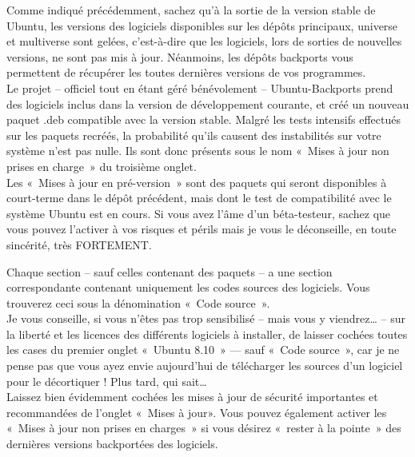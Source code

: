 {\begin{itemize}
\end{itemize}
Comme indiqué précédemment, sachez qu'à la sortie de la version stable de Ubuntu, les versions des logiciels disponibles sur les dépôts principaux, universe et multiverse sont gelées, c'est-à-dire que les logiciels, lors de sorties de nouvelles versions, ne sont pas mis à jour. Néanmoins, les dépôts backports vous permettent de récupérer les toutes dernières versions de vos programmes.\\
Le projet -- officiel tout en étant géré bénévolement -- Ubuntu-Backports prend des logiciels inclus dans la version de développement courante, et créé un nouveau paquet .deb compatible avec la version stable. Malgré les tests intensifs effectués sur les paquets recréés, la probabilité qu'ils causent des instabilités sur votre système n'est pas nulle. Ils sont donc présents sous le nom «~Mises à jour non prises en charge~» du troisième onglet.\\
Les «~Mises à jour en pré-version~» sont des paquets qui seront disponibles à court-terme dans le dépôt précédent, mais dont le test de compatibilité avec le système Ubuntu est en cours. Si vous avez l'âme d'un béta-testeur, sachez que vous pouvez l'activer à vos risques et périls mais je vous le déconseille, en toute sincérité, très FORTEMENT.\par
Chaque section -- sauf celles contenant des paquets  -- a une section correspondante contenant uniquement les codes sources des logiciels. Vous trouverez ceci sous la dénomination «~Code source~».\\
Je vous conseille, si vous n'êtes pas trop sensibilisé -- mais vous y viendrez\ldots{} -- sur la liberté et les licences des différents logiciels à installer, de laisser cochées toutes les cases du premier onglet «~Ubuntu 8.10~» --- sauf «~Code source~», car je ne pense pas que vous ayez envie aujourd'hui de télécharger les sources d'un logiciel pour le décortiquer ! Plus tard, qui sait\ldots{}\\
Laissez bien évidemment cochées les mises à jour de sécurité importantes et recommandées de l'onglet «~Mises à jour». Vous pouvez également activer les «~Mises à jour non prises en charges~» si vous désirez «~rester à la pointe~» des dernières versions backportées des logiciels.
}
